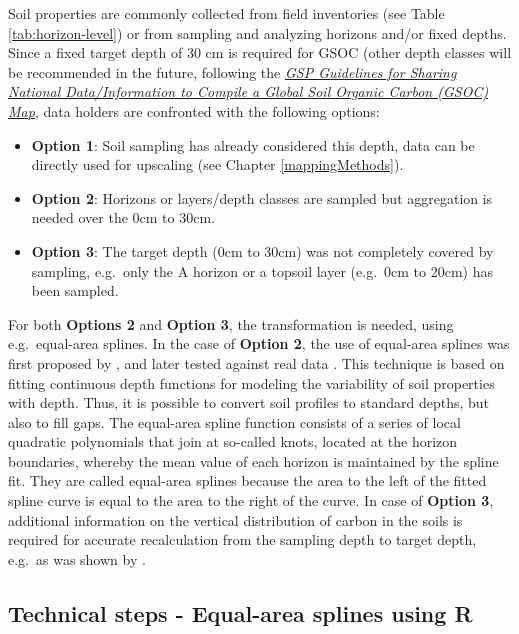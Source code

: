 \documentclass[10pt,b5paper,]{book}
\providecommand{\tightlist}{%
  \setlength{\itemsep}{0pt}\setlength{\parskip}{0pt}}
\theoremstyle{definition}
\theoremstyle{definition}
\theoremstyle{definition}
\theoremstyle{remark}
\begin{document}
Soil properties are commonly collected from field inventories (see Table
\ref{tab:horizon-level}) or from sampling and analyzing horizons and/or
fixed depths. Since a fixed target depth of 30 cm is required for GSOC
(other depth classes will be recommended in the future, following the
\href{http://www.fao.org/3/a-bp164e.pdf}{\emph{GSP Guidelines for
Sharing National Data/Information to Compile a Global Soil Organic
Carbon (GSOC) Map}}, data holders are confronted with the following
options:

\begin{itemize}
\tightlist
\item
  \textbf{Option 1}: Soil sampling has already considered this depth,
  data can be directly used for upscaling (see Chapter
  \ref{mappingMethods}).
\item
  \textbf{Option 2}: Horizons or layers/depth classes are sampled but
  aggregation is needed over the 0cm to 30cm.
\item
  \textbf{Option 3}: The target depth (0cm to 30cm) was not completely
  covered by sampling, e.g.~only the A horizon or a topsoil layer
  (e.g.~0cm to 20cm) has been sampled.
\end{itemize}

For both \textbf{Options 2} and \textbf{Option 3}, the transformation is
needed, using e.g.~equal-area splines. In the case of \textbf{Option 2},
the use of equal-area splines was first proposed by
\cite{ponce1986improved}, and later tested against real data
\citep{bishop1999modelling}. This technique is based on fitting
continuous depth functions for modeling the variability of soil
properties with depth. Thus, it is possible to convert soil profiles to
standard depths, but also to fill gaps. The equal-area spline function
consists of a series of local quadratic polynomials that join at
so-called knots, located at the horizon boundaries, whereby the mean
value of each horizon is maintained by the spline fit. They are called
equal-area splines because the area to the left of the fitted spline
curve is equal to the area to the right of the curve. In case of
\textbf{Option 3}, additional information on the vertical distribution
of carbon in the soils is required for accurate recalculation from the
sampling depth to target depth, e.g.~as was shown by
\cite{bernoux1998modeling}.

\hypertarget{EqualAreaSplines}{%
\subsection{Technical steps - Equal-area splines using
R}\label{EqualAreaSplines}}
\end{document}
